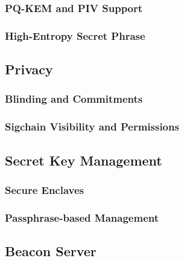 \subsubsection{PQ-KEM and PIV Support}

\subsubsection{High-Entropy Secret Phrase}
\label{sec:hesp}

\subsection{Privacy}

\subsubsection{Blinding and Commitments}
\label{sec:commitments}

\subsubsection{Sigchain Visibility and Permissions}
\label{sec:sigchain-viz}

\subsection{Secret Key Management}

\subsubsection{Secure Enclaves}

\subsubsection{Passphrase-based Management}
\label{sec:passphrase}

\subsection{Beacon Server}
\label{sec:beacon}

